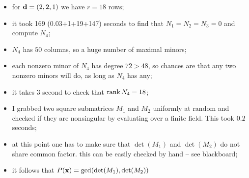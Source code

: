 \documentclass[]{beamer}
\begin{document}
\begin{frame}
\begin{example}[cont]
	\begin{itemize}
		\item for $\mathbf d=(2,2,1)$ we have $r=18$ rows;
		\item it took 169 (0.03+1+19+147) seconds to find that $N_1=N_2=N_3=0$ and compute $N_4$;
		\item $N_4$ has $50$ columns, so a huge number of maximal minors;
		\item each nonzero minor of $N_4$ has degree $72>48$, so chances are that any two nonzero minors will do,
			as long as $N_4$ has any;
		\item it takes 3 second to check that $\operatorname{rank} N_4=18$;
		\item I grabbed two square submatrices $M_1$ and $M_2$ uniformly at random and checked if they are nonsingular
			by evaluating over a finite field. This took $0.2$ seconds; 
		\item at this point one has to make sure that $\det(M_1)$ and $\det(M_2)$ do not share common factor.
			this can be easily checked by hand -- see blackboard;
		\item it follows that $P(\mathbf x)=\gcd(\det(M_1),\det(M_2))$
	\end{itemize}
\end{example}
\end{frame}
\end{document}
